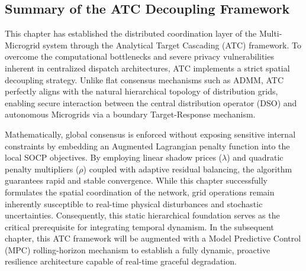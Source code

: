 \subsection{Summary of the ATC Decoupling Framework}

This chapter has established the distributed coordination layer of the Multi-Microgrid system through the Analytical Target Cascading (ATC) framework. To overcome the computational bottlenecks and severe privacy vulnerabilities inherent in centralized dispatch architectures, ATC implements a strict spatial decoupling strategy. Unlike flat consensus mechanisms such as ADMM, ATC perfectly aligns with the natural hierarchical topology of distribution grids, enabling secure interaction between the central distribution operator (DSO) and autonomous Microgrids via a boundary Target-Response mechanism.

Mathematically, global consensus is enforced without exposing sensitive internal constraints by embedding an Augmented Lagrangian penalty function into the local SOCP objectives. By employing linear shadow prices ($\lambda$) and quadratic penalty multipliers ($\rho$) coupled with adaptive residual balancing, the algorithm guarantees rapid and stable convergence. While this chapter successfully formulates the spatial coordination of the network, grid operations remain inherently susceptible to real-time physical disturbances and stochastic uncertainties. Consequently, this static hierarchical foundation serves as the critical prerequisite for integrating temporal dynamism. In the subsequent chapter, this ATC framework will be augmented with a Model Predictive Control (MPC) rolling-horizon mechanism to establish a fully dynamic, proactive resilience architecture capable of real-time graceful degradation.
